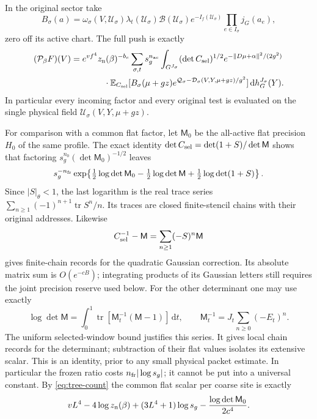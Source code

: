 \documentclass[11pt,reqno]{amsart}
\numberwithin{equation}{section}
\theoremstyle{definition}
\theoremstyle{remark}
\newcommand{\dd}{\mathrm d}
\DeclareMathOperator{\tr}{tr}
\begin{document}
In the original sector take
\[
 B_\sigma(a)=\omega_\sigma(V,\mathcal U_\sigma)
       \lambda_t(\mathcal U_\sigma)\mathcal B(\mathcal U_\sigma)
       e^{-I_f(\mathcal U_\sigma)}\prod_{e\in I_\sigma}j_G(a_e),
\]
zero off its active chart. The full push is exactly
\begin{align}
 (\mathcal P_\beta F)(V)
  ={}&e^{vf^4}z_{\rm n}(\beta)^{-b_c}
   \sum_{\sigma,t}s_g^{n_{\rm ac}}\int_{G^{J_\sigma}}
       (\det C_{\rm sel})^{1/2}e^{-\|D\mu+\alpha\|^2/(2g^2)}
                                                        \notag\\
 &\hspace{9mm}\cdot\mathbb E_{C_{\rm sel}}
       [B_\sigma(\mu+gz)e^{\mathcal Q_\sigma
                    -\mathcal D_\sigma(V,Y,\mu+gz)/g^2}]
                                      \,\dd h_G^{J_\sigma}(Y).
 \label{eq:physical-selected-full-push}
\end{align}
In particular every incoming factor and every original test is
evaluated on the single physical field
\(\mathcal U_\sigma(V,Y,\mu+gz)\).

For comparison with a common flat factor, let \(\mathsf M_0\)
be the all-active flat precision \(H_0\) of the same profile.
The exact identity
\(\det C_{\rm sel}=\det(1+S)/\det\mathsf M\) shows that
factoring \(s_g^{n_0}(\det\mathsf M_0)^{-1/2}\) leaves
\begin{equation}
 s_g^{-n_{\rm fr}}
  \exp\!\left\{\tfrac12\log\det\mathsf M_0
       -\tfrac12\log\det\mathsf M+\tfrac12\log\det(1+S)\right\}.
 \label{eq:physical-selected-frozen-ratio}
\end{equation}
Since \(|S|_\theta<1\), the last logarithm is the real
trace series \(\sum_{n\ge1}(-1)^{n+1}\tr S^n/n\).
Its traces are closed finite-stencil chains with their original
addresses. Likewise
\[
 C_{\rm sel}^{-1}-\mathsf M
                  =\sum_{n\ge1}(-S)^n\mathsf M
\]
gives finite-chain records for the quadratic Gaussian correction.
Its absolute matrix sum is \(O(e^{-cB})\); integrating products
of its Gaussian letters still requires the joint precision
reserve used below. For the other determinant one may use exactly
\[
 \log\det\mathsf M=\int_0^1
                 \tr[\mathsf M_t^{-1}(\mathsf M-1)]\,\dd t,
 \qquad
 \mathsf M_t^{-1}=J_t\sum_{n\ge0}(-E_t)^n.
\]
The uniform selected-window bound justifies this series.
It gives local chain records for the determinant; subtraction of
their flat values isolates its extensive scalar. This is an
identity, prior to any small physical packet estimate.
In particular the frozen ratio costs
\(n_{\rm fr}|\log s_g|\); it cannot be put into a universal
constant. By \eqref{eq:tree-count} the common flat scalar per
coarse site is exactly
\[
       vL^4-4\log z_{\rm n}(\beta)
        +(3L^4+1)\log s_g-\frac{\log\det\mathsf M_0}{2c^4}.
\]
\end{document}
